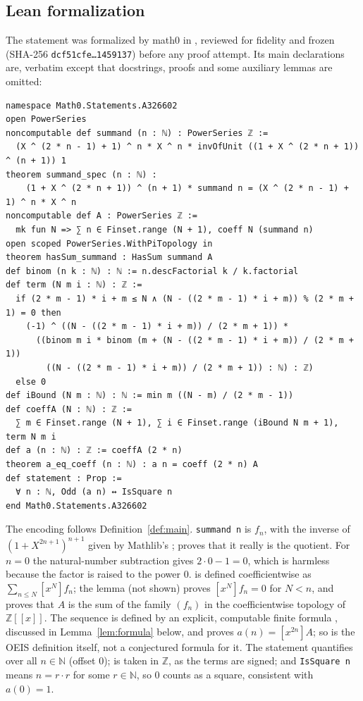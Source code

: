 \documentclass[11pt]{amsart}
\theoremstyle{plain}
\theoremstyle{definition}
\newcommand{\N}{\mathbb{N}}
\newcommand{\Z}{\mathbb{Z}}
\newcommand{\ZX}{\mathbb{Z}[[x]]}
\newcommand{\co}[1]{[x^{#1}]}
\begin{document}
\subsection*{Lean formalization}
The statement was formalized by math0 in , reviewed for fidelity and frozen (SHA-256 \texttt{dcf51cfe\ldots 1459137}) before any proof attempt. Its main declarations are, verbatim except that docstrings, proofs and some auxiliary lemmas are omitted:
\begin{lstlisting}
namespace Math0.Statements.A326602
open PowerSeries
noncomputable def summand (n : ℕ) : PowerSeries ℤ :=
  (X ^ (2 * n - 1) + 1) ^ n * X ^ n * invOfUnit ((1 + X ^ (2 * n + 1)) ^ (n + 1)) 1
theorem summand_spec (n : ℕ) :
    (1 + X ^ (2 * n + 1)) ^ (n + 1) * summand n = (X ^ (2 * n - 1) + 1) ^ n * X ^ n
noncomputable def A : PowerSeries ℤ :=
  mk fun N => ∑ n ∈ Finset.range (N + 1), coeff N (summand n)
open scoped PowerSeries.WithPiTopology in
theorem hasSum_summand : HasSum summand A
def binom (n k : ℕ) : ℕ := n.descFactorial k / k.factorial
def term (N m i : ℕ) : ℤ :=
  if (2 * m - 1) * i + m ≤ N ∧ (N - ((2 * m - 1) * i + m)) % (2 * m + 1) = 0 then
    (-1) ^ ((N - ((2 * m - 1) * i + m)) / (2 * m + 1)) *
      ((binom m i * binom (m + (N - ((2 * m - 1) * i + m)) / (2 * m + 1))
        ((N - ((2 * m - 1) * i + m)) / (2 * m + 1)) : ℕ) : ℤ)
  else 0
def iBound (N m : ℕ) : ℕ := min m ((N - m) / (2 * m - 1))
def coeffA (N : ℕ) : ℤ :=
  ∑ m ∈ Finset.range (N + 1), ∑ i ∈ Finset.range (iBound N m + 1), term N m i
def a (n : ℕ) : ℤ := coeffA (2 * n)
theorem a_eq_coeff (n : ℕ) : a n = coeff (2 * n) A
def statement : Prop :=
  ∀ n : ℕ, Odd (a n) ↔ IsSquare n
end Math0.Statements.A326602
\end{lstlisting}
The encoding follows Definition~\ref{def:main}. \texttt{summand n} is $f_n$, with the inverse of $(1+X^{2n+1})^{n+1}$ given by Mathlib's ;  proves that it really is the quotient. For $n=0$ the natural-number subtraction gives $2\cdot0-1=0$, which is harmless because the factor is raised to the power $0$.  is defined coefficientwise as $\sum_{n\le N}\co Nf_n$; the lemma  (not shown) proves $\co Nf_n=0$ for $N<n$, and  proves that $A$ is the sum of the family $(f_n)$ in the coefficientwise topology of $\ZX$.
The sequence  is defined by an explicit, computable finite formula , discussed in Lemma~\ref{lem:formula} below, and  proves $a(n)=\co{2n}A$; so  is the OEIS definition itself, not a conjectured formula for it.
The statement quantifies over all $n\in\N$ (offset $0$);  is taken in $\Z$, as the terms are signed; and \texttt{IsSquare n} means $n=r\cdot r$ for some $r\in\N$, so $0$ counts as a square, consistent with $a(0)=1$.
\end{document}
